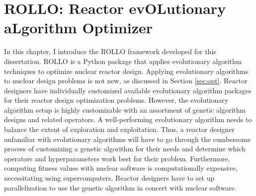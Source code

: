 \chapter{ROLLO: Reactor evOLutionary aLgorithm Optimizer}
\label{chap:rollo}
In this chapter, I introduce the \gls{ROLLO} framework developed for this dissertation. 
\gls{ROLLO} is a Python package that applies evolutionary algorithm 
techniques to optimize nuclear reactor design. 
Applying evolutionary algorithms to nuclear design problems is not new, as
discussed in Section \ref{sec:opt}. 
Reactor designers have individually customized available evolutionary algorithm 
packages for their reactor design optimization problems.
However, the evolutionary algorithm setup is highly customizable with
an assortment of genetic algorithm designs and related operators.
A well-performing evolutionary algorithm needs to balance the extent of exploration 
and exploitation. 
Thus, a reactor designer unfamiliar with evolutionary algorithms will have
to go through the cumbersome process of customizing a genetic algorithm 
for their needs and determine which operators and hyperparameters work best for 
their problem. 
Furthermore, computing fitness values with nuclear software is computationally 
expensive, necessitating using supercomputers. 
Reactor designers have to set up parallelization to use the genetic algorithm 
in concert with nuclear software.


